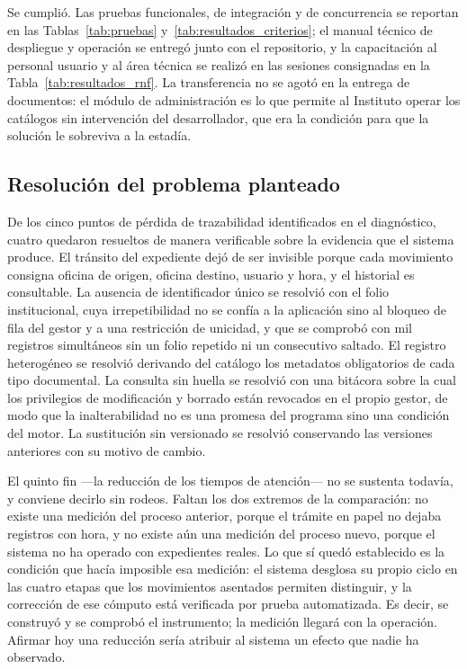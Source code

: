 \begin{description}[leftmargin=0pt,font=\bfseries,itemsep=0.55em,parsep=0pt]
  \item[6. Liberar y transferir la solución.]\leavevmode
  Se cumplió. Las pruebas funcionales, de integración y de concurrencia se reportan en las Tablas~\ref{tab:pruebas} y~\ref{tab:resultados_criterios}; el manual técnico de despliegue y operación se entregó junto con el repositorio, y la capacitación al personal usuario y al área técnica se realizó en las sesiones consignadas en la Tabla~\ref{tab:resultados_rnf}. La transferencia no se agotó en la entrega de documentos: el módulo de administración es lo que permite al Instituto operar los catálogos sin intervención del desarrollador, que era la condición para que la solución le sobreviva a la estadía.
\end{description}

\subsection{Resolución del problema planteado}

De los cinco puntos de pérdida de trazabilidad identificados en el diagnóstico, cuatro quedaron resueltos de manera verificable sobre la evidencia que el sistema produce. El tránsito del expediente dejó de ser invisible porque cada movimiento consigna oficina de origen, oficina destino, usuario y hora, y el historial es consultable. La ausencia de identificador único se resolvió con el folio institucional, cuya irrepetibilidad no se confía a la aplicación sino al bloqueo de fila del gestor y a una restricción de unicidad, y que se comprobó con mil registros simultáneos sin un folio repetido ni un consecutivo saltado. El registro heterogéneo se resolvió derivando del catálogo los metadatos obligatorios de cada tipo documental. La consulta sin huella se resolvió con una bitácora sobre la cual los privilegios de modificación y borrado están revocados en el propio gestor, de modo que la inalterabilidad no es una promesa del programa sino una condición del motor. La sustitución sin versionado se resolvió conservando las versiones anteriores con su motivo de cambio.

El quinto fin —la reducción de los tiempos de atención— no se sustenta todavía, y conviene decirlo sin rodeos. Faltan los dos extremos de la comparación: no existe una medición del proceso anterior, porque el trámite en papel no dejaba registros con hora, y no existe aún una medición del proceso nuevo, porque el sistema no ha operado con expedientes reales. Lo que sí quedó establecido es la condición que hacía imposible esa medición: el sistema desglosa su propio ciclo en las cuatro etapas que los movimientos asentados permiten distinguir, y la corrección de ese cómputo está verificada por prueba automatizada. Es decir, se construyó y se comprobó el instrumento; la medición llegará con la operación. Afirmar hoy una reducción sería atribuir al sistema un efecto que nadie ha observado.

